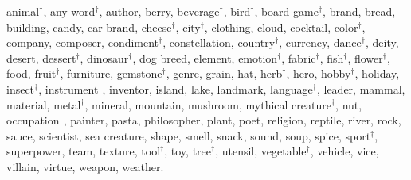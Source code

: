 animal$^\dagger$, any word$^\dagger$, author, berry, beverage$^\dagger$, bird$^\dagger$, board game$^\dagger$, brand, bread, building, candy, car brand, cheese$^\dagger$, city$^\dagger$, clothing, cloud, cocktail, color$^\dagger$, company, composer, condiment$^\dagger$, constellation, country$^\dagger$, currency, dance$^\dagger$, deity, desert, dessert$^\dagger$, dinosaur$^\dagger$, dog breed, element, emotion$^\dagger$, fabric$^\dagger$, fish$^\dagger$, flower$^\dagger$, food, fruit$^\dagger$, furniture, gemstone$^\dagger$, genre, grain, hat, herb$^\dagger$, hero, hobby$^\dagger$, holiday, insect$^\dagger$, instrument$^\dagger$, inventor, island, lake, landmark, language$^\dagger$, leader, mammal, material, metal$^\dagger$, mineral, mountain, mushroom, mythical creature$^\dagger$, nut, occupation$^\dagger$, painter, pasta, philosopher, plant, poet, religion, reptile, river, rock, sauce, scientist, sea creature, shape, smell, snack, sound, soup, spice, sport$^\dagger$, superpower, team, texture, tool$^\dagger$, toy, tree$^\dagger$, utensil, vegetable$^\dagger$, vehicle, vice, villain, virtue, weapon, weather.
